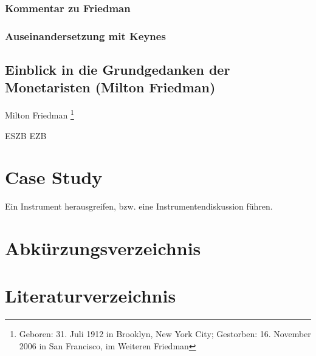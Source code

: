 \documentclass[
        onecolumn,
        a4paper,
        abstracton,
        parskip=half
        ,final
        ]{scrartcl}
\begin{document}
\subsubsection{Kommentar zu Friedman}

\subsubsection{Auseinandersetzung mit Keynes}









\subsection{Einblick in die Grundgedanken der Monetaristen (Milton Friedman)}
Milton Friedman \footnote[16]{Geboren: 31. Juli 1912 in Brooklyn, New York City; Gestorben: 16. November 2006 in San Francisco, im Weiteren Friedman}

\clearpage
\ac{ESZB}
\ac{EZB}



\section{Case Study}
\label{sec4:CaseStudy}
Ein Instrument herausgreifen, bzw. eine Instrumentendiskussion f{\"u}hren.





\clearpage

\section{Abk{\"u}rzungsverzeichnis}
	\label{sec5:Abkuerzungsverzeichnis}

\begin{acronym}[ESZB]



\end{acronym}

\vspace{10pt}
	\newpage
  	\singlespacing



\section{Literaturverzeichnis}
	\label{sec6:Literaturverzeichnis}
	\newpage





\end{document}
